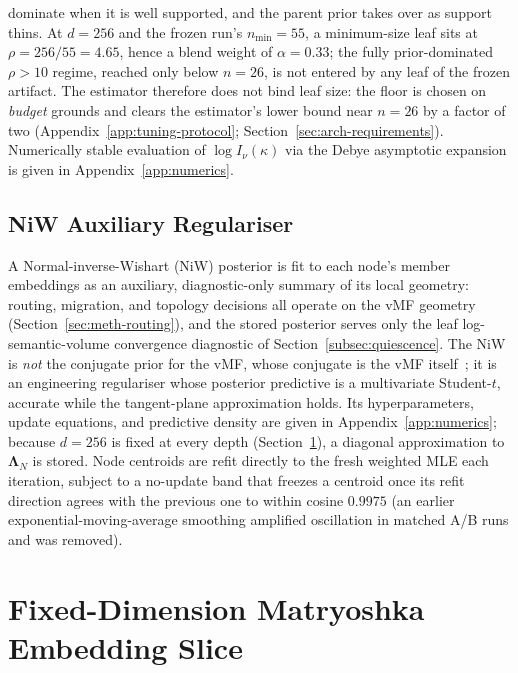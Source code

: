dominate when it is well supported, and the parent prior takes over as support thins.
At $d = 256$ and the frozen run's $n_{\min} = 55$, a minimum-size leaf sits at
$\rho = 256/55 = 4.65$, hence a blend weight of $\alpha = 0.33$; the fully
prior-dominated $\rho > 10$ regime, reached only below $n = 26$, is not entered by any
leaf of the frozen artifact.
The estimator therefore does not bind leaf size: the floor is chosen on \emph{budget}
grounds and clears the estimator's lower bound near $n = 26$ by a factor of two
(Appendix~\ref{app:tuning-protocol}; Section~\ref{sec:arch-requirements}).
Numerically stable evaluation of $\log I_\nu(\kappa)$ via the Debye asymptotic expansion
is given in Appendix~\ref{app:numerics}.

\subsection{NiW Auxiliary Regulariser}

A Normal-inverse-Wishart (NiW) posterior is fit to each node's member embeddings as an
auxiliary, diagnostic-only summary of its local geometry: routing, migration, and
topology decisions all operate on the vMF geometry (Section~\ref{sec:meth-routing}), and
the stored posterior serves only the leaf log-semantic-volume convergence diagnostic of
Section~\ref{subsec:quiescence}.
The NiW is \textit{not} the conjugate prior for the vMF, whose conjugate is the vMF
itself~\parencite{gopal2014mises}; it is an engineering regulariser whose posterior
predictive is a multivariate Student-$t$, accurate while the tangent-plane approximation
holds. Its hyperparameters, update equations, and predictive density are given in
Appendix~\ref{app:numerics}; because $d = 256$ is fixed at every depth
(Section~\ref{sec:meth-mrl}), a diagonal approximation to $\boldsymbol{\Lambda}_N$ is
stored.
Node centroids are refit directly to the fresh weighted MLE each iteration, subject to a
no-update band that freezes a centroid once its refit direction agrees with the previous
one to within cosine $0.9975$ (an earlier exponential-moving-average smoothing amplified
oscillation in matched A/B runs and was removed).

\section{Fixed-Dimension Matryoshka Embedding Slice}\label{sec:meth-mrl}\label{subsec:dim-schedule}

